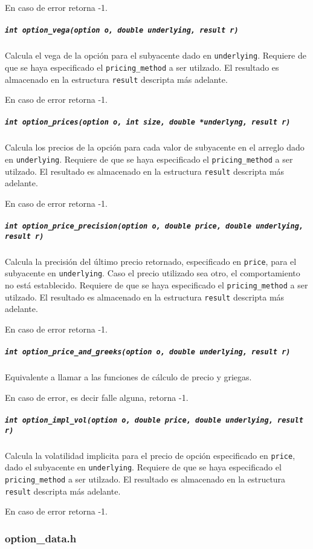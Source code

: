 \documentclass[12pt,a4paper,final]{article}
\begin{document}
				En caso de error retorna -1.
					
			\subparagraph{\texttt{int option\_vega(option o, double underlying, result r)}}
				Calcula el vega de la opción para el subyacente dado en \texttt{underlying}.
				Requiere de que se haya especificado el \texttt{pricing\_method} a ser utilzado.
				El resultado es almacenado en la estructura \texttt{result} descripta más adelante.
					
				En caso de error retorna -1.
					
			\subparagraph{\texttt{int option\_prices(option o, int size, double *underlyng, result r)}}
				Calcula los precios de la opción para cada valor de subyacente en el arreglo dado en
				\texttt{underlying}.
				Requiere de que se haya especificado el \texttt{pricing\_method} a ser utilzado.
				El resultado es almacenado en la estructura \texttt{result} descripta más adelante.
					
				En caso de error retorna -1.
					
			\subparagraph{\texttt{int option\_price\_precision(option o, double price, double underlying, result r)}}
				Calcula la precisión del último precio retornado, especificado en \texttt{price}, para
				el subyacente en \texttt{underlying}. Caso el precio utilizado sea otro, el comportamiento
				no está establecido.
				Requiere de que se haya especificado el \texttt{pricing\_method} a ser utilzado.
				El resultado es almacenado en la estructura \texttt{result} descripta más adelante.
					
				En caso de error retorna -1.
					
			\subparagraph{\texttt{int option\_price\_and\_greeks(option o, double underlying, result r)}}
				Equivalente a llamar a las funciones de cálculo de precio y griegas.
					
				En caso de error, es decir falle alguna, retorna -1.
					
			\subparagraph{\texttt{int option\_impl\_vol(option o, double price, double underlying, result r)}}
				Calcula la volatilidad implicita para el precio de opción especificado en \texttt{price}, dado
				el subyacente en \texttt{underlying}.
				Requiere de que se haya especificado el \texttt{pricing\_method} a ser utilzado.
				El resultado es almacenado en la estructura \texttt{result} descripta más adelante.
					
				En caso de error retorna -1.
					

		\subsubsection{option\_data.h}
		
\end{document}
